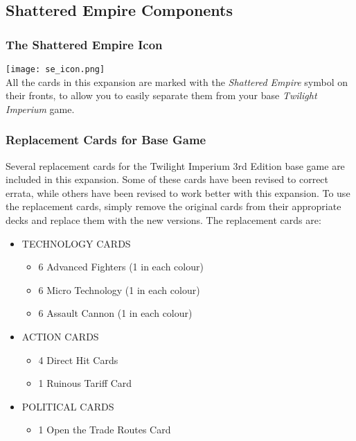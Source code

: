 \documentclass[11pt,fleqn]{book} %
\begin{document}
\begin{SEbox}
\subsection{Shattered Empire Components}
\subsubsection{The Shattered Empire Icon}

\texttt{[image: se\_icon.png]}\\

All the cards in this expansion are marked with the \emph{Shattered Empire} symbol on their fronts, to allow you to easily separate them from your base \emph{Twilight Imperium} game.

\subsubsection{Replacement Cards for Base Game}

Several replacement cards for the Twilight Imperium 3rd Edition base game are included in this expansion. Some of these cards have been revised to correct errata, while others have been revised to work better with this expansion. To use the replacement cards, simply remove the original cards from their appropriate decks and replace them with the new versions. The replacement cards are:
\begin{itemize}
\item TECHNOLOGY CARDS
\begin{itemize}
\item 6 Advanced Fighters (1 in each colour)
\item 6 Micro Technology (1 in each colour)
\item 6 Assault Cannon (1 in each colour)
\end{itemize}
\item ACTION CARDS
\begin{itemize}
\item 4 Direct Hit Cards
\item 1 Ruinous Tariff Card
\end{itemize}
\item POLITICAL CARDS
\begin{itemize}
\item 1 Open the Trade Routes Card
\end{itemize}
\end{itemize}
\end{SEbox}
\end{document}
